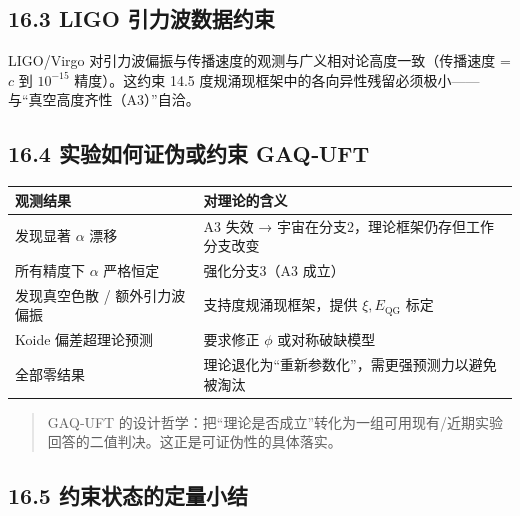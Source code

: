 \subsection{16.3 LIGO
引力波数据约束}\label{ligo-ux5f15ux529bux6ce2ux6570ux636eux7ea6ux675f}

LIGO/Virgo 对引力波偏振与传播速度的观测与广义相对论高度一致（传播速度 =
\(c\) 到 \(10^{-15}\) 精度）。这约束 14.5
度规涌现框架中的各向异性残留必须极小------与``真空高度齐性（A3）''自洽。

\subsection{16.4 实验如何证伪或约束
GAQ‑UFT}\label{ux5b9eux9a8cux5982ux4f55ux8bc1ux4f2aux6216ux7ea6ux675f-gaquft}

\begin{longtable}[]{@{}
  >{\raggedright\arraybackslash}p{}
  >{\raggedright\arraybackslash}p{}@{}}
\toprule\noalign{}
\begin{minipage}[b]{\linewidth}\raggedright
观测结果
\end{minipage} & \begin{minipage}[b]{\linewidth}\raggedright
对理论的含义
\end{minipage} \\
\midrule\noalign{}
\endhead
\bottomrule\noalign{}
\endlastfoot
发现显著 \(\alpha\) 漂移 & A3 失效 →
宇宙在分支2，理论框架仍存但工作分支改变 \\
所有精度下 \(\alpha\) 严格恒定 & 强化分支3（A3 成立） \\
发现真空色散 / 额外引力波偏振 & 支持度规涌现框架，提供
\(\xi,E_{\mathrm{QG}}\) 标定 \\
Koide 偏差超理论预测 & 要求修正 \(\phi\) 或对称破缺模型 \\
全部零结果 & 理论退化为``重新参数化''，需更强预测力以避免被淘汰 \\
\end{longtable}

\begin{quote}
GAQ‑UFT
的设计哲学：把``理论是否成立''转化为一组可用现有/近期实验回答的二值判决。这正是可证伪性的具体落实。
\end{quote}

\subsection{16.5
约束状态的定量小结}\label{ux7ea6ux675fux72b6ux6001ux7684ux5b9aux91cfux5c0fux7ed3}

